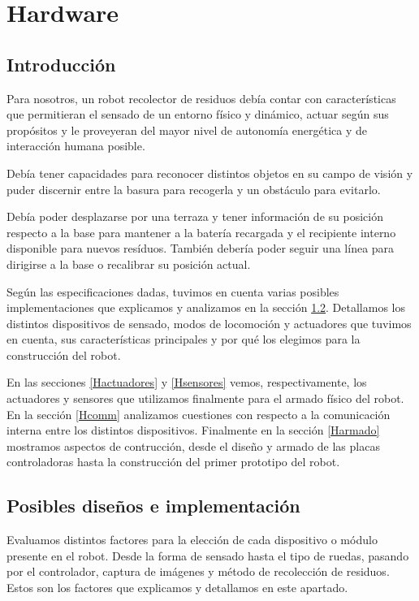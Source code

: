 \section{Hardware}

\subsection{Introducci\'on}
\label{Hintro}
Para nosotros, un robot recolector de residuos deb\'ia contar con caracter\'isticas que permitieran el sensado de un entorno f\'isico y din\'amico,
actuar seg\'un sus prop\'ositos y le proveyeran del mayor nivel de autonom\'ia energ\'etica y de interacci\'on humana posible.

Deb\'ia tener capacidades para reconocer distintos objetos en su campo de visi\'on y puder discernir entre la basura para recogerla y un
obst\'aculo para evitarlo.

Deb\'ia poder desplazarse por una terraza y tener informaci\'on de su posici\'on respecto a la base para mantener a la bater\'ia recargada y
el recipiente interno disponible para nuevos res\'iduos. Tambi\'en deber\'ia poder seguir una l\'inea para dirigirse a la base o recalibrar
su posici\'on actual.

Seg\'un las especificaciones dadas, tuvimos en cuenta varias posibles implementaciones que explicamos y analizamos en la secci\'on \ref{HposiblesDisenos}.
Detallamos los distintos dispositivos de sensado, modos de locomoci\'on y actuadores que tuvimos en cuenta, sus caracter\'isticas principales y por qu\'e
los elegimos para la construcci\'on del robot.

En las secciones \ref{Hactuadores} y \ref{Hsensores} vemos, respectivamente, los actuadores y sensores que utilizamos finalmente para el armado
f\'isico del robot.
En la secci\'on \ref{Hcomm} analizamos cuestiones con respecto a la comunicaci\'on interna entre los distintos dispositivos.
Finalmente en la secci\'on \ref{Harmado} mostramos aspectos de contrucci\'on, desde el dise\~no y armado de las placas controladoras hasta la
construcci\'on del primer prototipo del robot.

\subsection{Posibles dise\~nos e implementaci\'on}
\label{HposiblesDisenos}

Evaluamos distintos factores para la elecci\'on de cada dispositivo o m\'odulo presente en el robot. Desde la forma de sensado hasta el
tipo de ruedas, pasando por el controlador, captura de im\'agenes y m\'etodo de recolecci\'on de residuos. Estos son los factores que explicamos y
detallamos en este apartado.

